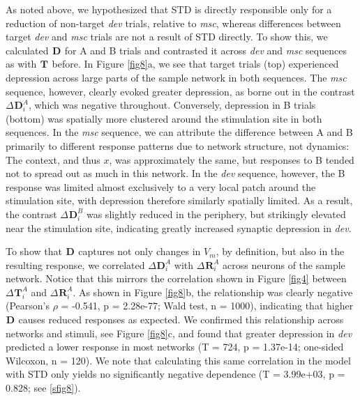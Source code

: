 \documentclass[pdflatex,referee,iicol,sn-basic]{sn-jnl}
\newcommand{\dev}{\textit{dev}}
\newcommand{\msc}{\textit{msc}}
\renewcommand{\R}[3][]{{}^{#1}_{}\mathbf{R}^{#2}_{#3}}
\renewcommand{\T}[3][]{{}^{#1}_{}\mathbf{T}^{#2}_{#3}}
\newcommand{\D}[3][]{{}^{#1}_{}\mathbf{D}^{#2}_{#3}}
\newcommand{\reffig}[1]{Figure \ref{fig#1}}
\newcommand{\refpanel}[2]{Figure \ref{fig#1}\lowercase{#2}}
\begin{document}
As noted above, we hypothesized that STD is directly responsible only for a reduction of non-target \dev{} trials, relative to \msc{}, whereas differences between target \dev{} and \msc{} trials are not a result of STD directly. To show this, we calculated $\D{}{}$ for A and B trials and contrasted it across \dev{} and \msc{} sequences as with $\T{}{}$ before.
In \refpanel{8}{a}, we see that target trials (top) experienced depression across large parts of the sample network in both sequences. The \msc{} sequence, however, clearly evoked greater depression, as borne out in the contrast $\Delta \D{A}{i}$, which was negative throughout. Conversely, depression in B trials (bottom) was spatially more clustered around the stimulation site in both sequences. In the \msc{} sequence, we can attribute the difference between A and B primarily to different response patterns due to network structure, not dynamics: The context, and thus $x$, was approximately the same, but responses to B tended not to spread out as much in this network. In the \dev{} sequence, however, the B response was limited almost exclusively to a very local patch around the stimulation site, with depression therefore similarly spatially limited. As a result, the contrast $\Delta \D{B}{i}$ was slightly reduced in the periphery, but strikingly elevated near the stimulation site, indicating greatly increased synaptic depression in \dev{}.

To show that $\D{}{}$ captures not only changes in $V_m$, by definition, but also in the resulting response, we correlated $\Delta \D{A}{i}$ with $\Delta \R{A}{i}$ across neurons of the sample network. Notice that this mirrors the correlation shown in \reffig{4} between $\Delta \T{A}{i}$ and $\Delta \R{A}{i}$. As shown in \refpanel{8}{b}, the relationship was clearly negative (Pearson's $\rho$ = -0.541, p = 2.28e-77; Wald test, n = 1000), indicating that higher $\D{}{}$ causes reduced responses as expected. We confirmed this relationship across networks and stimuli, see \refpanel{8}{c}, and found that greater depression in \dev{} predicted a lower response in most networks (T = 724, p = 1.37e-14; one-sided Wilcoxon, n = 120). We note that calculating this same correlation in the model with STD only yields no significantly negative dependence (T = 3.99e+03, p = 0.828; see \ref{sfig8}).
\end{document}
